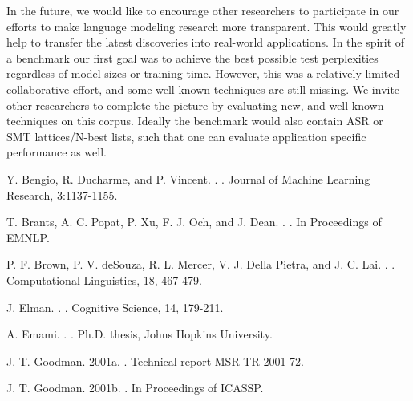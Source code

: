 \documentclass[11pt,letterpaper]{article}
\begin{document}
In the future, we would like to encourage other researchers to participate in our efforts
to make language modeling research more transparent. This would greatly help to transfer
the latest discoveries into real-world applications. In the spirit of a benchmark our first
goal was to achieve the best possible test perplexities regardless of model sizes or training
time. However, this was a relatively limited collaborative effort, and some well known techniques
are still missing. We invite other researchers to complete the picture by evaluating new,
and well-known techniques  on this corpus. Ideally the benchmark would also contain ASR or SMT
lattices/N-best lists,  such that one can evaluate application specific performance as well.


\begin{thebibliography}{}

Y. Bengio, R. Ducharme, and P. Vincent.
.
.
\newblock Journal of Machine Learning Research, 3:1137-1155.

T. Brants, A. C. Popat, P. Xu, F. J. Och, and J. Dean.
.
.
\newblock In Proceedings of EMNLP.

P. F. Brown, P. V. deSouza, R. L. Mercer, V. J. Della Pietra, and J. C. Lai.
.
.
\newblock Computational Linguistics, 18, 467-479.

J. Elman.
.
.
\newblock Cognitive Science, 14, 179-211.

A. Emami.
.
.
\newblock Ph.D. thesis, Johns Hopkins University.

J. T. Goodman.
\newblock 2001a.
.
\newblock Technical report MSR-TR-2001-72.

J. T. Goodman.
\newblock 2001b.
.
\newblock In Proceedings of ICASSP.


\end{thebibliography}
\end{document}
